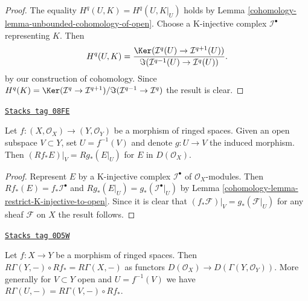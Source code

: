 \begin{proof}

The equality $H^q(U, K) = H^q(U, K|_U)$ holds by
Lemma \ref{cohomology-lemma-unbounded-cohomology-of-open}.
Choose a K-injective complex $\mathcal{I}^\bullet$ representing $K$.
Then
$$
H^q(U, K) =
\frac{\Ker(\mathcal{I}^q(U) \to \mathcal{I}^{q + 1}(U))}
{\Im(\mathcal{I}^{q - 1}(U) \to \mathcal{I}^q(U))}.
$$
by our construction of cohomology. Since
$H^q(K) = \Ker(\mathcal{I}^q \to \mathcal{I}^{q + 1})/
\Im(\mathcal{I}^{q - 1} \to \mathcal{I}^q)$ the result is clear.
\end{proof}

\begin{lemma}
\label{cohomology-lemma-restrict-direct-image-open}
\href{https://stacks.math.columbia.edu/tag/08FE}{\texttt{Stacks tag 08FE}}

Let $f : (X, \mathcal{O}_X) \to (Y, \mathcal{O}_Y)$ be a morphism of ringed
spaces. Given an open subspace $V \subset Y$, set $U = f^{-1}(V)$ and denote
$g : U \to V$ the induced morphism. Then
$(Rf_*E)|_V = Rg_*(E|_U)$ for $E$ in $D(\mathcal{O}_X)$.
\end{lemma}

\begin{proof}

Represent $E$ by a K-injective complex $\mathcal{I}^\bullet$ of
$\mathcal{O}_X$-modules. Then $Rf_*(E) = f_*\mathcal{I}^\bullet$
and $Rg_*(E|_U) = g_*(\mathcal{I}^\bullet|_U)$ by
Lemma \ref{cohomology-lemma-restrict-K-injective-to-open}.
Since it is clear that $(f_*\mathcal{F})|_V = g_*(\mathcal{F}|_U)$
for any sheaf $\mathcal{F}$ on $X$ the result follows.
\end{proof}

\begin{lemma}
\label{cohomology-lemma-Leray-unbounded}
\href{https://stacks.math.columbia.edu/tag/0D5W}{\texttt{Stacks tag 0D5W}}

Let $f : X \to Y$ be a morphism of ringed spaces.
Then $R\Gamma(Y, -) \circ Rf_* = R\Gamma(X, -)$ as functors
$D(\mathcal{O}_X) \to D(\Gamma(Y, \mathcal{O}_Y))$.
More generally for $V \subset Y$ open and $U = f^{-1}(V)$
we have $R\Gamma(U, -) = R\Gamma(V, -) \circ Rf_*$.
\end{lemma}

